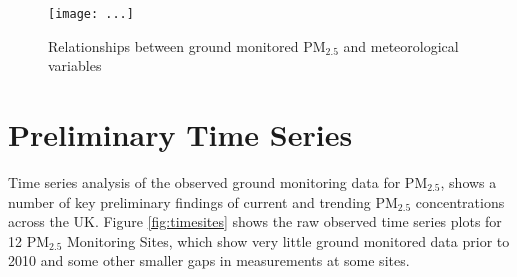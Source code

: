 \begin{figure}[h]
    \centering
    \texttt{[image: ...]}
    \caption{Relationships between ground monitored PM$_{2.5}$ and meteorological variables}
    \label{fig:metcorr}
\end{figure}

\section{Preliminary Time Series} \label{App:Time Series}
Time series analysis of the observed ground monitoring data for PM$_{2.5}$, shows a number of key preliminary findings of current and trending PM$_{2.5}$ concentrations across the UK. Figure \ref{fig:timesites} shows the raw observed time series plots for 12 PM$_{2.5}$ Monitoring Sites, which show very little ground monitored data prior to 2010 and some other smaller gaps in measurements at some sites.

